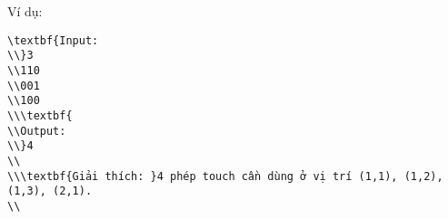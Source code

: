 Ví dụ:
\begin{verbatim}
\textbf{Input:
\\}3
\\110 
\\001
\\100
\\\textbf{
\\Output:
\\}4
\\
\\\textbf{Giải thích: }4 phép touch cần dùng ở vị trí (1,1), (1,2), (1,3), (2,1).
\\\end{verbatim}